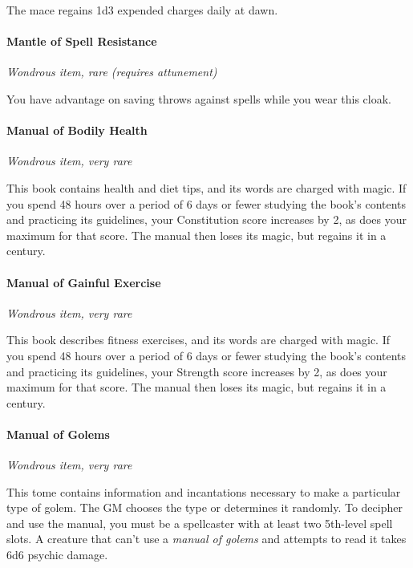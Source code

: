 \documentclass[
]{article}
\begin{document}
The mace regains 1d3 expended charges daily at dawn.

\hypertarget{mantle-of-spell-resistance}{%
\paragraph{Mantle of Spell
Resistance}\label{mantle-of-spell-resistance}}

\emph{Wondrous item, rare (requires attunement)}

You have advantage on saving throws against spells while you wear this
cloak.

\hypertarget{manual-of-bodily-health}{%
\paragraph{Manual of Bodily Health}\label{manual-of-bodily-health}}

\emph{Wondrous item, very rare}

This book contains health and diet tips, and its words are charged with
magic. If you spend 48 hours over a period of 6 days or fewer studying
the book's contents and practicing its guidelines, your Constitution
score increases by 2, as does your maximum for that score. The manual
then loses its magic, but regains it in a century.

\hypertarget{manual-of-gainful-exercise}{%
\paragraph{Manual of Gainful
Exercise}\label{manual-of-gainful-exercise}}

\emph{Wondrous item, very rare}

This book describes fitness exercises, and its words are charged with
magic. If you spend 48 hours over a period of 6 days or fewer studying
the book's contents and practicing its guidelines, your Strength score
increases by 2, as does your maximum for that score. The manual then
loses its magic, but regains it in a century.

\hypertarget{manual-of-golems}{%
\paragraph{Manual of Golems}\label{manual-of-golems}}

\emph{Wondrous item, very rare}

This tome contains information and incantations necessary to make a
particular type of golem. The GM chooses the type or determines it
randomly. To decipher and use the manual, you must be a spellcaster with
at least two 5th-level spell slots. A creature that can't use a
\emph{manual of golems} and attempts to read it takes 6d6 psychic
damage.
\end{document}
